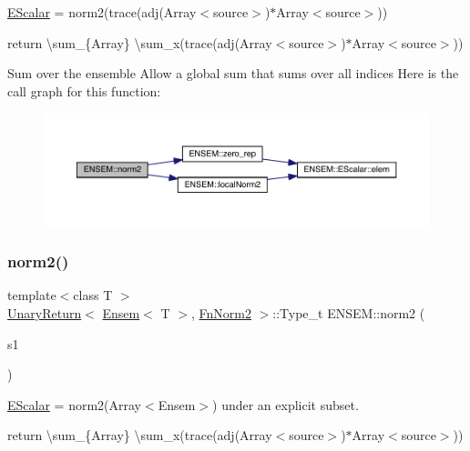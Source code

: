 \mbox{\hyperlink{classENSEM_1_1EScalar}{E\+Scalar}} = norm2(trace(adj(\+Array$<$source$>$)$\ast$\+Array$<$source$>$)) 

return \textbackslash{}sum\+\_\+\{Array\} \textbackslash{}sum\+\_\+x(trace(adj(\+Array$<$source$>$)$\ast$\+Array$<$source$>$))

Sum over the ensemble Allow a global sum that sums over all indices Here is the call graph for this function\+:\nopagebreak
\begin{figure}[H]
\begin{center}
\leavevmode
\includegraphics[width=350pt]{d2/d94/namespaceENSEM_afe2995777022f093a0938da761cb5ac3_cgraph}
\end{center}
\end{figure}
\mbox{\label{namespaceENSEM_a67904e4929712a1fa81e70ed7980c05b}} 
\subsubsection{\texorpdfstring{norm2()}{norm2()}\hspace{0.1cm}{\footnotesize\ttfamily [3/3]}}
{\footnotesize\ttfamily template$<$class T $>$ \\
\mbox{\hyperlink{structENSEM_1_1UnaryReturn}{Unary\+Return}}$<$ \mbox{\hyperlink{classENSEM_1_1Ensem}{Ensem}}$<$ T $>$, \mbox{\hyperlink{structENSEM_1_1FnNorm2}{Fn\+Norm2}} $>$\+::Type\+\_\+t E\+N\+S\+E\+M\+::norm2 (\begin{DoxyParamCaption}\item[{const \mbox{\hyperlink{classXMLArray_1_1Array}{Array}}$<$ \mbox{\hyperlink{classENSEM_1_1Ensem}{Ensem}}$<$ T $>$ $>$ \&}]{s1 }\end{DoxyParamCaption})\hspace{0.3cm}{\ttfamily [inline]}}



\mbox{\hyperlink{classENSEM_1_1EScalar}{E\+Scalar}} = norm2(\+Array$<$\+Ensem$>$) under an explicit subset. 

return \textbackslash{}sum\+\_\+\{Array\} \textbackslash{}sum\+\_\+x(trace(adj(\+Array$<$source$>$)$\ast$\+Array$<$source$>$))

